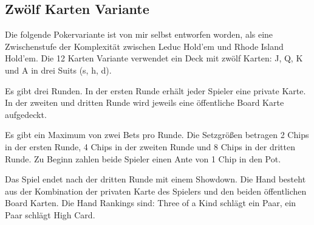\subsection{Zwölf Karten Variante}
Die folgende Pokervariante ist von mir selbst entworfen worden, als eine Zwischenstufe der Komplexität zwischen Leduc Hold'em und Rhode Island Hold'em.
Die 12 Karten Variante verwendet ein Deck mit zwölf Karten: J, Q, K und A in drei Suits (s, h, d).

Es gibt drei Runden.
In der ersten Runde erhält jeder Spieler eine private Karte.
In der zweiten und dritten Runde wird jeweils eine öffentliche Board Karte aufgedeckt.

Es gibt ein Maximum von zwei Bets pro Runde.
Die Setzgrößen betragen 2 Chips in der ersten Runde, 4 Chips in der zweiten Runde und 8 Chips in der dritten Runde.
Zu Beginn zahlen beide Spieler einen Ante von 1 Chip in den Pot.

Das Spiel endet nach der dritten Runde mit einem Showdown.
Die Hand besteht aus der Kombination der privaten Karte des Spielers und den beiden öffentlichen Board Karten.
Die Hand Rankings sind: Three of a Kind schlägt ein Paar, ein Paar schlägt High Card.


